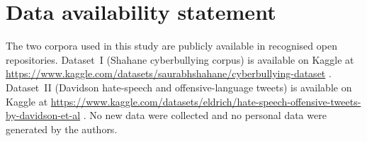 \documentclass[10pt,twocolumn,a4paper]{article}
\begin{document}
\section*{Data availability statement}
The two corpora used in this study are publicly available in recognised open repositories. Dataset~I (Shahane cyberbullying corpus) is available on Kaggle at \url{https://www.kaggle.com/datasets/saurabhshahane/cyberbullying-dataset} \citep{ref10}. Dataset~II (Davidson hate-speech and offensive-language tweets) is available on Kaggle at \url{https://www.kaggle.com/datasets/eldrich/hate-speech-offensive-tweets-by-davidson-et-al} \citep{ref11}. No new data were collected and no personal data were generated by the authors.

\end{document}
